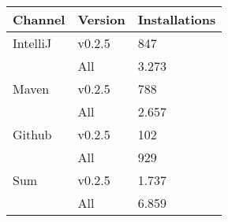 \begin{tabular}{lll}
  Channel          & Version  &  Installations\\
  \hline
  \hline
  IntelliJ         & v0.2.5   &  847            \\
                   & All      &  3.273\\
  Maven            & v0.2.5   &  788            \\
                   & All      &  2.657          \\
  Github           & v0.2.5   &  102            \\
                   & All      &  929            \\
\hline
  Sum        & v0.2.5   &  1.737          \\
                   & All      &  6.859          
\end{tabular}
